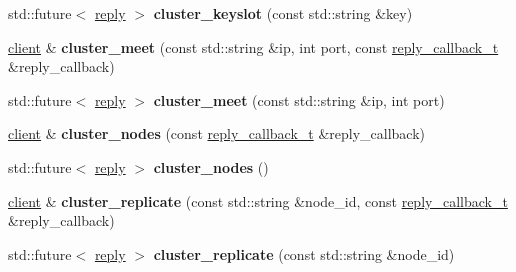 \begin{DoxyCompactItemize}
\mbox{\label{classcpp__redis_1_1client_a5681ac2dfdacc19cde1a828d8b801df1}} 
std\+::future$<$ \mbox{\hyperlink{classcpp__redis_1_1reply}{reply}} $>$ {\bfseries cluster\+\_\+keyslot} (const std\+::string \&key)
\item 
\mbox{\label{classcpp__redis_1_1client_aefc94be1dc7eb11673ba92bc8cbffdcf}} 
\mbox{\hyperlink{classcpp__redis_1_1client}{client}} \& {\bfseries cluster\+\_\+meet} (const std\+::string \&ip, int port, const \mbox{\hyperlink{classcpp__redis_1_1client_af7a65eb21aa25230bfbb0b0203c4fc04}{reply\+\_\+callback\+\_\+t}} \&reply\+\_\+callback)
\item 
\mbox{\label{classcpp__redis_1_1client_af142b166d5f88f76f5fd46e6e33c0523}} 
std\+::future$<$ \mbox{\hyperlink{classcpp__redis_1_1reply}{reply}} $>$ {\bfseries cluster\+\_\+meet} (const std\+::string \&ip, int port)
\item 
\mbox{\label{classcpp__redis_1_1client_a1e4cc880ce249fcad1b1f6ddd15f515f}} 
\mbox{\hyperlink{classcpp__redis_1_1client}{client}} \& {\bfseries cluster\+\_\+nodes} (const \mbox{\hyperlink{classcpp__redis_1_1client_af7a65eb21aa25230bfbb0b0203c4fc04}{reply\+\_\+callback\+\_\+t}} \&reply\+\_\+callback)
\item 
\mbox{\label{classcpp__redis_1_1client_a6e777dc7b54ecb4aff3e1c281f92dd81}} 
std\+::future$<$ \mbox{\hyperlink{classcpp__redis_1_1reply}{reply}} $>$ {\bfseries cluster\+\_\+nodes} ()
\item 
\mbox{\label{classcpp__redis_1_1client_a65688223390e47c0400ba4a128000f89}} 
\mbox{\hyperlink{classcpp__redis_1_1client}{client}} \& {\bfseries cluster\+\_\+replicate} (const std\+::string \&node\+\_\+id, const \mbox{\hyperlink{classcpp__redis_1_1client_af7a65eb21aa25230bfbb0b0203c4fc04}{reply\+\_\+callback\+\_\+t}} \&reply\+\_\+callback)
\item 
\mbox{\label{classcpp__redis_1_1client_a4ce5b739522aefd5ca7c8aef8c76cc61}} 
std\+::future$<$ \mbox{\hyperlink{classcpp__redis_1_1reply}{reply}} $>$ {\bfseries cluster\+\_\+replicate} (const std\+::string \&node\+\_\+id)
\item 

\end{DoxyCompactItemize}
